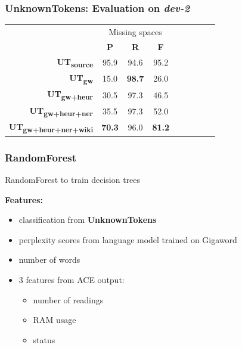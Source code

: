 \documentclass[table]{beamer}
\begin{document}
\begin{frame}
  \frametitle{\textbf{UnknownTokens}: Evaluation on \textit{dev-2}}
  \begin{tabular}{r|c|c|c|c|c|c|c|c|}
  & \multicolumn{3}{c|}{Missing spaces}\\
  & \textbf{P} & \textbf{R} & \textbf{F}\\
  \hline
  \textbf{UT\textsubscript{source}} & 95.9 & 94.6 & 95.2\\
  \hline\hline\pause
  \textbf{UT\textsubscript{gw}} & 15.0 & \textbf{98.7} & 26.0\\
  \hline\pause
  \textbf{UT\textsubscript{gw+heur}} & 30.5 & 97.3 & 46.5\\
  \hline\pause
  \textbf{UT\textsubscript{gw+heur+ner}} & 35.5 & 97.3 & 52.0\\
  \hline\pause
  \textbf{UT\textsubscript{gw+heur+ner+wiki}} & \textbf{70.3} & 96.0 & \textbf{81.2}\\
  \hline
  \end{tabular}
\end{frame}

\begin{frame}
  \frametitle{\textbf{RandomForest}}
  RandomForest \citep{breiman2001random} to train decision trees
  \vspace{0.6cm}

  \textbf{Features:}\pause
  \begin{itemize}
    \item classification from \textbf{UnknownTokens}\pause
    \item perplexity scores from language model trained on Gigaword\pause
    \item number of words\pause
    \item 3 features from ACE \citep{ace} output:
    \begin{itemize}
      \item number of readings
      \item RAM usage
      \item status
    \end{itemize}
  \end{itemize}
\end{frame}
\end{document}
